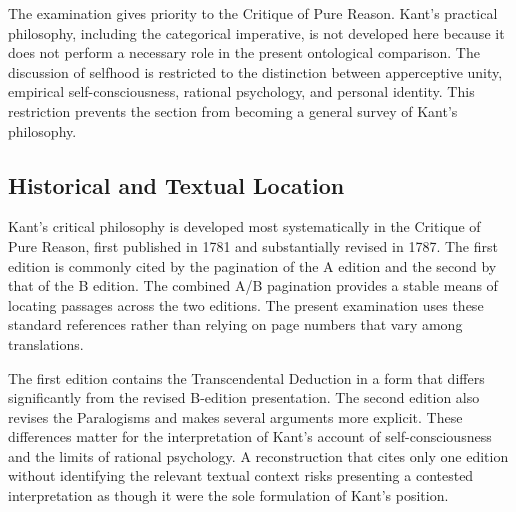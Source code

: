 \label{para:VS.B01.P01.C08.S10.SS01.P004}

The examination gives priority to the Critique of Pure
Reason. Kant's practical philosophy, including the
categorical imperative, is not developed here because
it does not perform a necessary role in the present
ontological comparison. The discussion of selfhood is
restricted to the distinction between apperceptive unity,
empirical self-consciousness, rational psychology, and
personal identity. This restriction prevents the section
from becoming a general survey of Kant's philosophy.



\subsection{Historical and Textual Location}
\label{subsec:ch08-kant-historical}

\label{para:VS.B01.P01.C08.S10.SS02.P001}

Kant's critical philosophy is developed most systematically
in the Critique of Pure Reason, first published in 1781
and substantially revised in 1787. The first edition is
commonly cited by the pagination of the A edition and the
second by that of the B edition. The combined A/B
pagination provides a stable means of locating passages
across the two editions. The present examination uses
these standard references rather than relying on page
numbers that vary among translations.
\cite{KantCritiquePureReason}

\label{para:VS.B01.P01.C08.S10.SS02.P002}

The first edition contains the Transcendental Deduction
in a form that differs significantly from the revised
B-edition presentation. The second edition also revises
the Paralogisms and makes several arguments more explicit.
These differences matter for the interpretation of
Kant's account of self-consciousness and the limits of
rational psychology. A reconstruction that cites only
one edition without identifying the relevant textual
context risks presenting a contested interpretation
as though it were the sole formulation of Kant's position.

